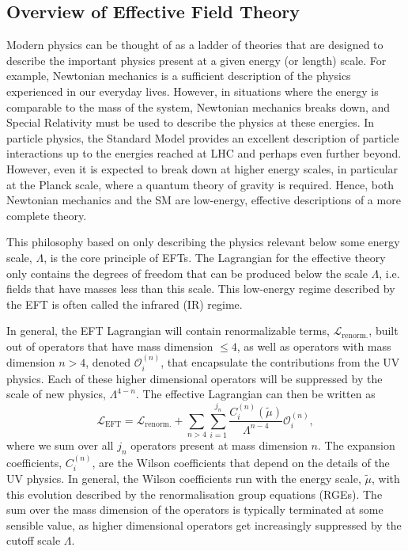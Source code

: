 \subsection{Overview of Effective Field Theory}
\label{ch1:subsec:EFT_intro}

Modern physics can be thought of as a ladder of theories that are designed to describe the important physics present at a given energy (or length) scale. For example, Newtonian mechanics is a sufficient description of the physics experienced in our everyday lives. However, in situations where the energy is comparable to the mass of the system, Newtonian mechanics breaks down, and Special Relativity must be used to describe the physics at these energies. In particle physics, the Standard Model provides an excellent description of particle interactions up to the energies reached at LHC and perhaps even further beyond. However, even it is expected to break down at higher energy scales, in particular at the Planck scale, where a quantum theory of gravity is required. Hence, both Newtonian mechanics and the SM are low-energy, effective descriptions of a more complete theory.

This philosophy based on only describing the physics relevant below some energy scale, $\Lambda$, is the core principle of EFTs. The Lagrangian for the effective theory only contains the degrees of freedom that can be produced below the scale $\Lambda$, i.e. fields that have masses less than this scale. This low-energy regime described by the EFT is often called the infrared (IR) regime. 

In general, the EFT Lagrangian will contain renormalizable terms, $\mathcal{L}_\mathrm{renorm.}$,  built out of operators that have mass dimension $\leq 4$, as well as operators with mass dimension $n> 4$, denoted $\mathcal{O}_i^{(n)}$, that encapsulate the contributions from the UV physics. Each of these higher dimensional operators will be suppressed by the scale of new physics, $\Lambda^{4-n}$. 
The effective Lagrangian can then be written as
\begin{equation}
    \mathcal{L}_\mathrm{EFT} = \mathcal{L}_\mathrm{renorm.} +  \sum_{n>4}   \sum_{i = 1}^{j_n} \frac{C_i^{(n)} (\tilde{\mu})}{\Lambda^{n-4}}\mathcal{O}_i^{(n)},
    \label{ch1:eq:EFT_Lagrangian}
\end{equation}
where we sum over all $j_n$ operators present at mass dimension $n$. The expansion coefficients, $C_i^{(n)}$, are the Wilson coefficients that depend on the details of the UV physics. In general, the Wilson coefficients run with the energy scale, $\tilde{\mu}$, with this evolution described by the renormalisation group equations (RGEs).
The sum over the mass dimension of the operators is typically terminated at some sensible value, as higher dimensional operators get increasingly suppressed by the cutoff scale $\Lambda$.

